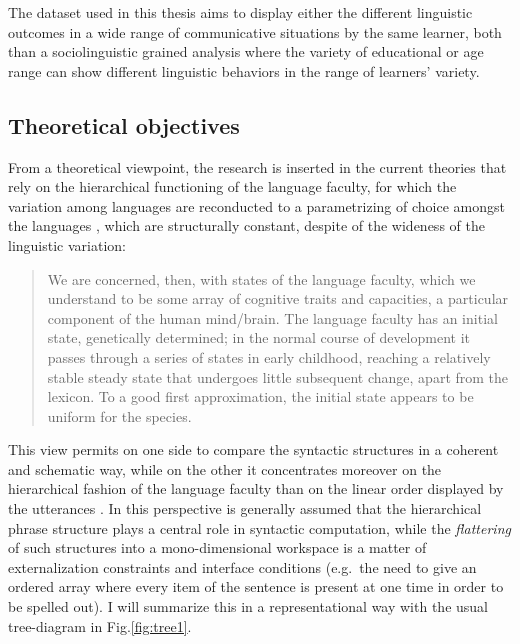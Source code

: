 \documentclass[
  a4paper,
  twoside,
  12pt,
  chapterprefix=false,
  bibliography=totocnumbered,
  listof=flat]{scrbook}
\begin{document}
The dataset used in this thesis aims to display either the different linguistic outcomes in a wide range of communicative situations by the same learner, both than a sociolinguistic grained analysis where the variety of educational or age range can show different linguistic behaviors in the range of learners' variety.

\hypertarget{theoretical-objectives}{%
\subsection{Theoretical objectives}\label{theoretical-objectives}}

From a theoretical viewpoint, the research is inserted in the current theories that rely on the hierarchical functioning of the language faculty, for which the variation among languages are reconducted to a parametrizing of choice amongst the languages \citep{adger2013, chomsky1995, chomsky1998, chomsky2013, chomsky2015, rizzi2013}, which are structurally constant, despite of the wideness of the linguistic variation:

\begin{quote}
We are concerned, then, with states of the language faculty, which we understand to be some array of cognitive traits and capacities, a particular component of the human mind/brain. The language faculty has an initial state, genetically determined; in the normal course of development it passes through a series of states in early childhood, reaching a relatively stable steady state that undergoes little subsequent change, apart from the lexicon. To a good first approximation, the initial state appears to be uniform for the species.
\citep{chomsky1995}
\end{quote}

This view permits on one side to compare the syntactic structures in a coherent and schematic way, while on the other it concentrates moreover on the hierarchical fashion of the language faculty than on the linear order displayed by the utterances \citep{kayne1994, moro2000}. In this perspective is generally assumed that the hierarchical phrase structure plays a central role in syntactic computation, while the \emph{flattering} of such structures into a mono-dimensional workspace is a matter of externalization constraints and interface conditions (e.g.~the need to give an ordered array where every item of the sentence is present at one time in order to be spelled out).
I will summarize this in a representational way with the usual tree-diagram in Fig.\ref{fig:tree1}.
\end{document}
